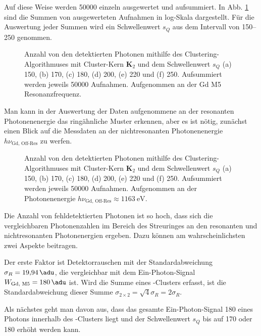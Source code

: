 \noindent
Auf diese Weise werden \SI{50000}{\captures} einzeln ausgewertet und aufsummiert. In Abb. \ref{fig:cl_2_150_170_180_200_220_250_resonance} sind die Summen von ausgewerteten Aufnahmen in log-Skala dargestellt. Für die Auswertung jeder Summen wird ein Schwellenwert $s_Q$ aus dem Intervall von \SIrange{150}{250}{\adu} genommen.
\begin{figure}[H]
    \centering
    
    \caption{Anzahl von den detektierten Photonen mithilfe des Clustering-Algorithmuses mit Cluster-Kern $\mathbf{K}_2$ und dem Schwellenwert $s_Q$ (a) \SI{150}{\adu}, (b) \SI{170}{\adu}, (c) \SI{180}{\adu}, (d) \SI{200}{\adu}, (e) \SI{220}{\adu} und (f) \SI{250}{\adu}. Aufsummiert werden jeweils \num{50000} Aufnahmen. Aufgenommen an der Gd M5 Resonanzfrequenz.}
    \label{fig:cl_2_150_170_180_200_220_250_resonance}
\end{figure}
\noindent
Man kann in der Auswertung der Daten aufgenommene an der resonanten Photonenenergie das ringähnliche Muster erkennen, aber es ist nötig, zunächst einen Blick auf die Messdaten an der nichtresonanten Photonenenergie $h\nu_\text{Gd, Off-Res}$ zu werfen.
\begin{figure}[H]
    \centering
    
    \caption{Anzahl von den detektierten Photonen mithilfe des Clustering-Algorithmuses mit Cluster-Kern $\mathbf{K}_2$ und dem Schwellenwert $s_Q$ (a) \SI{150}{\adu}, (b) \SI{170}{\adu}, (c) \SI{180}{\adu}, (d) \SI{200}{\adu}, (e) \SI{220}{\adu} und (f) \SI{250}{\adu}. Aufsummiert werden jeweils \num{50000} Aufnahmen. Aufgenommen an der Photonenenergie $h\nu_\text{Gd, Off-Res} \approx \SI{1163}{\eV}$.}
    \label{fig:cl_150_170_180_200_220_250_off_resonance}
\end{figure}
\noindent
Die Anzahl von fehldetektierten Photonen ist so hoch, dass sich die vergleichbaren Photonenzahlen im Bereich des Streuringes an den resonanten und nichtresonanten Photonenergien ergeben. Dazu können am wahrscheinlichsten zwei Aspekte beitragen. 

\noindent
Der erste Faktor ist Detektorrauschen mit der Standardabweichung $\sigma_R = \SI{19.94}{\adu}$, die vergleichbar mit dem Ein-Photon-Signal $W_\text{Gd, M5} = \SI{180}{\adu}$ ist. Wird die Summe eines -Clusters erfasst, ist die Standardabweichung dieser Summe $\sigma_{2\times 2} = \sqrt{4}\sigma_R = 2\sigma_R$. 

\noindent
Als nächstes geht man davon aus, dass das gesamte Ein-Photon-Signal \SI{180}{\adu} eines Photons innerhalb des -Clusters liegt und der Schwellenwert $s_Q$ bis auf \SI{170}{\adu} oder \SI{180}{\adu} erhöht werden kann.

